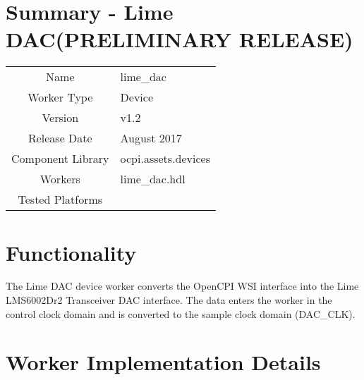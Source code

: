 \documentclass{article}
\author{} %
\date{Version \docVersion} %
\title{\docTitle}
\def\docVersion{1.2}
\def\comp{lime\_dac}
\def\Comp{Lime DAC}
\begin{document}
\section*{Summary - \Comp (PRELIMINARY RELEASE)}
\begin{tabular}{|c|M{13.5cm}|}
	\hline
	                  &                  \\
	\hline
	Name              & \comp            \\
	\hline
	Worker Type       & Device           \\
	\hline
	Version           & v\docVersion \\
	\hline
	Release Date      & August 2017 \\
	\hline
	Component Library & ocpi.assets.devices     \\
	\hline
	Workers           & \comp.hdl        \\
	\hline
	Tested Platforms  & \\
	\hline
\end{tabular}

\section*{Functionality}
\begin{flushleft}
	The Lime DAC device worker converts the OpenCPI WSI interface into the Lime LMS6002Dr2 Transceiver DAC interface. The data enters the worker in the control clock domain and is converted to the sample clock domain (DAC\_CLK).
\end{flushleft}

\section*{Worker Implementation Details}
\end{document}
